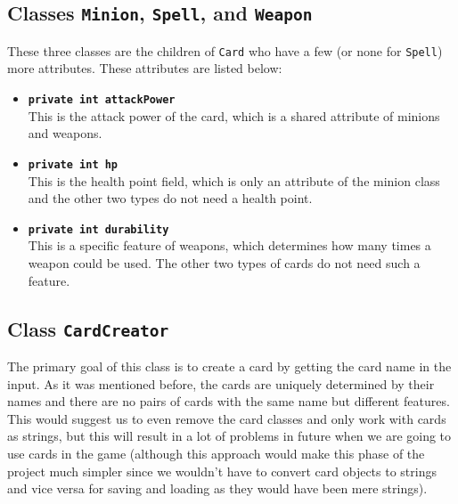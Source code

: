 \documentclass[a4paper]{article}
\begin{document}
\subsection{Classes \texttt{Minion}, \texttt{Spell}, and \texttt{Weapon}}
These three classes are the children of \texttt{Card} who have a few (or none for \texttt{Spell}) more attributes. These attributes are listed below:
\begin{itemize}
	\item \texttt{\textbf{private int attackPower}}\\
	This is the attack power of the card, which is a shared attribute of minions and weapons.
	
	\item \texttt{\textbf{private int hp}}\\
	This is the health point field, which is only an attribute of the minion class and the other two types do not need a health point.
	
	\item \texttt{\textbf{private int durability}}\\
	This is a specific feature of weapons, which determines how many times a weapon could be used. The other two types of cards do not need such a feature.
	
\end{itemize}

\subsection{Class \texttt{CardCreator}}
The primary goal of this class is to create a card by getting the card name in the input. As it was mentioned before, the cards are uniquely determined by their names and there are no pairs of cards with the same name but different features. This would suggest us to even remove the card classes and only work with cards as strings, but this will result in a lot of problems in future when we are going to use cards in the game (although this approach would make this phase of the project much simpler since we wouldn't have to convert card objects to strings and vice versa for saving and loading as they would have been mere strings). 
\end{document}
